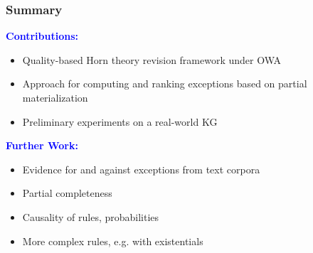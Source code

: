 \documentclass{beamer}
\newcommand{\bl}[1]{\textcolor{blue}{#1}}
\newcommand{\gr}[1]{\textcolor{darkgreen}{#1}}
\newcommand{\hilightbl}[1]{\colorbox{darkblue!18}{#1}}
\newcommand{\hilightred}[1]{\colorbox{red!18}{#1}}
\newcommand{\mi}[1]{\ensuremath{\mathit{#1}}}
\begin{document}

    


\begin{frame} \frametitle{Summary}
\textbf{\bl{Contributions:}}
\begin{itemize}
\item Quality-based Horn theory revision framework under OWA
\item Approach for computing and ranking exceptions based on partial materialization
\item Preliminary experiments on a real-world KG
\end{itemize}
\bigskip
\bigskip

\textbf{\bl{Further Work:}}
\begin{itemize}
\item Evidence for and against exceptions from text corpora
\item Partial completeness 
\item Causality of rules, probabilities
\item More complex rules, e.g. with existentials
\end{itemize}
\end{frame}
\end{document}

